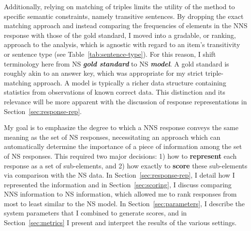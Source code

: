 Additionally, relying on matching of triples limits the utility of the method to specific semantic constraints, namely transitive sentences. By dropping the exact matching approach and instead comparing the frequencies of elements in the NNS response with those of the gold standard, I moved into a gradable, or ranking, approach to the analysis, which is agnostic with regard to an item's transitivity or sentence type (see Table~\ref{tab:sentence-type}). For this reason, I shift terminology here from NS \textit{\textbf{gold standard}} to NS \textit{\textbf{model}}. A gold standard is roughly akin to an answer key, which was appropriate for my strict triple-matching approach. A model is typically a richer data structure containing statistics from observations of known correct data. This distinction and its relevance will be more apparent with the discussion of response representations in Section~\ref{sec:response-rep}.

My goal is to emphasize the degree to which a NNS response conveys the same
meaning as the set of NS responses, necessitating an approach which can automatically
determine the importance of a piece of information among the set of NS responses.  This required two major decisions: 1) how to \textbf{represent} each response as a set of sub-elements, and 2) how exactly to \textbf{score} these sub-elements via comparison with the NS data. In Section~\ref{sec:response-rep}, I detail how I represented the information and in Section~\ref{sec:scoring}, I discuss comparing NNS information to NS information, which allowed me to rank responses from most to least similar to the NS model. In Section~\ref{sec:parameters}, I describe the system parameters that I combined to generate scores, and in Section~\ref{sec:metrics} I present and interpret the results of the various settings.

%
%
